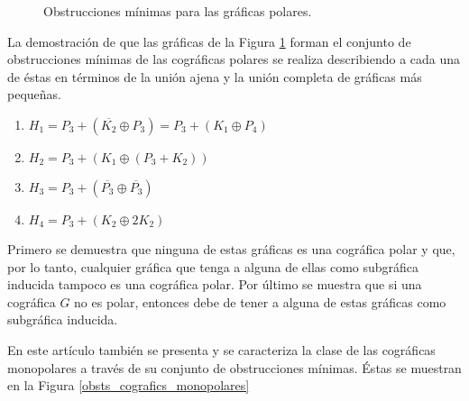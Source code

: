 \begin{figure}[ht!]
\begin{center}
\end{center}
\caption{Obstrucciones mínimas para las gráficas polares.}
\label{obsts_cografics_polares}
\end{figure}

La demostración de que las gráficas de la Figura \ref{obsts_cografics_polares} forman el conjunto de obstrucciones mínimas de las cográficas polares se realiza describiendo a cada una de éstas en términos de la unión ajena y la unión completa de gráficas más pequeñas.

\begin{enumerate}[(1)]
    \item $H_1 = P_3 + ( \overline{K_2} \oplus P_3) = P_3+ (K_1 \oplus P_4)$
    \item $H_2 = P_3 + (K_1 \oplus (P_3 + K_2))$
    \item $H_3 = P_3 + ( \overline{P_3} \oplus \overline{P_3})$
    \item $H_4 = P_3 + (K_2 \oplus 2K_2)$
\end{enumerate}

Primero se demuestra que ninguna de estas gráficas es una cográfica polar y que, por lo tanto, cualquier gráfica que tenga a alguna de ellas como subgráfica inducida tampoco es una cográfica polar. Por último se muestra que si una cográfica $G$ no es polar, entonces debe de tener a alguna de estas gráficas como subgráfica inducida.

En este artículo también se presenta y se caracteriza la clase de las cográficas monopolares a través de su conjunto de obstrucciones mínimas. Éstas se muestran en la Figura \ref{obsts_cografics_monopolares}



